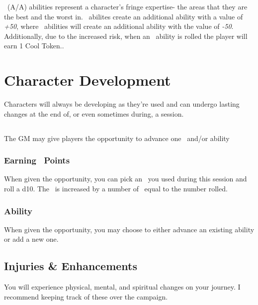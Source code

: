 \AWEAWF\ (A/A) abilities represent a character's fringe expertise- the areas that they are the best and the worst in. \AWE\ abilites create an additional ability with a value of \emph{+50}, where \AWF\ abilities will create an additional ability with the value of \emph{-50}. Additionally, due to the increased risk, when an \AWF\ ability is rolled the player will earn 1 Cool Token.. 



\chapter{Character Development}\label{ch:char_develop}
Characters will always be developing as they're used and can undergo lasting changes at the end of, or even sometimes during, a session.

\section{\advancement\index{\advancement}}\label{sec:advancement}
The GM may give players the opportunity to advance one \attribute\ and/or ability

\subsection{Earning \attribute\ Points}\label{subsec:adv_techniques}
When given the opportunity, you can pick an \attribute\ you used during this session and roll a d10. The \attribute\ is increased by a number of \attrval\ equal to the number rolled.

\subsection{Ability \advancement}\label{subsec:adv_ability}
When given the opportunity, you may choose to either advance an existing ability or add a new one.
\section{Injuries \& Enhancements}\label{sec:adv_injuries}
You will experience physical, mental, and spiritual changes on your journey. I recommend keeping track of these over the campaign.

